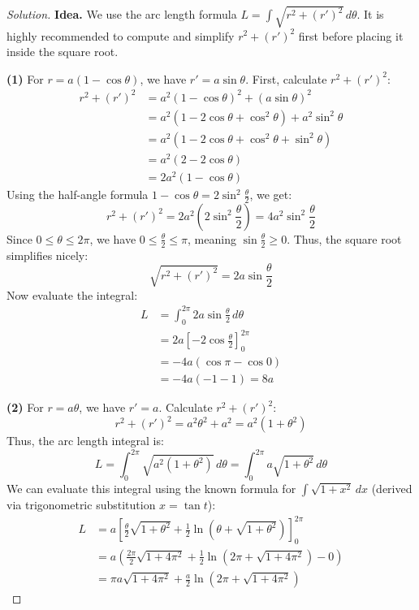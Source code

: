 \documentclass[11pt]{article}
\theoremstyle{definition}
\newenvironment{solution}{\begin{proof}[Solution]}{\end{proof}}
\begin{document}
\begin{solution}
\textbf{Idea.} We use the arc length formula $L = \int \sqrt{r^2 + (r')^2} \,d\theta$. It is highly recommended to compute and simplify $r^2 + (r')^2$ first before placing it inside the square root.

\textbf{(1)} For $r=a(1-\cos\theta)$, we have $r' = a\sin\theta$.
First, calculate $r^2 + (r')^2$:
\begin{align*}
r^2 + (r')^2 &= a^2(1-\cos\theta)^2 + (a\sin\theta)^2 \\
&= a^2(1 - 2\cos\theta + \cos^2\theta) + a^2\sin^2\theta \\
&= a^2(1 - 2\cos\theta + \cos^2\theta + \sin^2\theta) \\
&= a^2(2 - 2\cos\theta) \\
&= 2a^2(1 - \cos\theta)
\end{align*}
Using the half-angle formula $1-\cos\theta = 2\sin^2\frac{\theta}{2}$, we get:
\[
r^2 + (r')^2 = 2a^2 \left(2\sin^2\frac{\theta}{2}\right) = 4a^2\sin^2\frac{\theta}{2}
\]
Since $0 \leq \theta \leq 2\pi$, we have $0 \leq \frac{\theta}{2} \leq \pi$, meaning $\sin\frac{\theta}{2} \geq 0$. Thus, the square root simplifies nicely:
\[
\sqrt{r^2 + (r')^2} = 2a\sin\frac{\theta}{2}
\]
Now evaluate the integral:
\begin{align*}
L &= \int_{0}^{2\pi} 2a\sin\frac{\theta}{2} \,d\theta \\
&= 2a \left[ -2\cos\frac{\theta}{2} \right]_0^{2\pi} \\
&= -4a (\cos\pi - \cos0) \\
&= -4a (-1 - 1) = 8a
\end{align*}

\textbf{(2)} For $r=a\theta$, we have $r' = a$.
Calculate $r^2 + (r')^2$:
\[
r^2 + (r')^2 = a^2\theta^2 + a^2 = a^2(1+\theta^2)
\]
Thus, the arc length integral is:
\[
L = \int_{0}^{2\pi} \sqrt{a^2(1+\theta^2)} \,d\theta = \int_{0}^{2\pi} a\sqrt{1+\theta^2} \,d\theta
\]
We can evaluate this integral using the known formula for $\int \sqrt{1+x^2}\,dx$ (derived via trigonometric substitution $x = \tan t$):
\begin{align*}
L &= a \left[ \frac{\theta}{2}\sqrt{1+\theta^2} + \frac{1}{2}\ln(\theta + \sqrt{1+\theta^2}) \right]_0^{2\pi} \\
&= a \left( \frac{2\pi}{2}\sqrt{1+4\pi^2} + \frac{1}{2}\ln(2\pi + \sqrt{1+4\pi^2}) - 0 \right) \\
&= \pi a\sqrt{1+4\pi^2} + \frac{a}{2}\ln(2\pi + \sqrt{1+4\pi^2})
\end{align*}


\end{solution}
\end{document}
